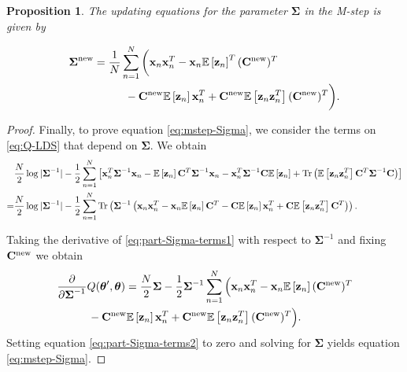 \documentclass[11pt]{article}
\numberwithin{equation}{section}
\newcommand{\expectation}[1]{\mathbb{E}\left[#1\right]}
\newcommand{\Tr}[1]{\text{Tr}\left(#1\right)}
\newcommand{\x}{{\bf x}}
\newcommand{\z}{{\bf z}}
\newtheorem{proposition}{Proposition}[section]
\begin{document}
\begin{proposition}
	The updating equations for the parameter $\boldsymbol{\Sigma}$ in the M-step is given by
	
	\begin{align}
		\boldsymbol{\Sigma}^{\text{\normalfont new}} &= \frac{1}{N}\sum_{n=1}^N\bigg(\x_n\x_n^T - \x_n \expectation{\z_n}^T ({\bf C}^{\text{\normalfont new}})^T \nonumber\\
		&\hspace{1cm} - {\bf C}^{\text{\normalfont new}}\expectation{\z_n}\x_n^T + {\bf C}^{\text{\normalfont new}} \expectation{\z_n \z_n^T}({\bf C}^{\text{\normalfont new}})^T \bigg). \label{eq:mstep-Sigma}
	\end{align}
\end{proposition}



\begin{proof}
	Finally, to prove equation \eqref{eq:mstep-Sigma}, we consider the terms on \eqref{eq:Q-LDS} that depend on $\boldsymbol{\Sigma}$. We obtain
	\begin{align}
		 & \frac{N}{2}\log\vert\boldsymbol\Sigma^{-1}\vert -\frac{1}{2}\sum_{n=1}^N \left[ \x_n^T \boldsymbol{\Sigma}^{-1}\x_n - \expectation{\z_n}{\bf C}^T\boldsymbol{\Sigma}^{-1}\x_n - \x_n^T \boldsymbol{\Sigma}^{-1}{\bf C}\expectation{\z_n} + \Tr{\expectation{\z_n\z_n^T}{\bf C}^T\boldsymbol{\Sigma}^{-1}{\bf C}} \right]\\
		=& \frac{N}{2}\log\vert\boldsymbol\Sigma^{-1}\vert -\frac{1}{2}\sum_{n=1}^N\Tr{\boldsymbol\Sigma^{-1} \left( \x_n\x_n^T - \x_n\expectation{\z_n}{\bf C}^T - {\bf C}\expectation{\z_n}\x_n^T + {\bf C}\expectation{\z_n\z_n^T}{\bf C}^T \right)}. \label{eq:part-Sigma-terms1}
	\end{align}
	
	Taking the derivative of \eqref{eq:part-Sigma-terms1} with respect to $\boldsymbol{\Sigma}^{-1}$ and fixing ${\bf C}^{\text{new}}$ we obtain
	\begin{align}
		&\frac{\partial}{\partial \boldsymbol{\Sigma}^{-1}} Q(\boldsymbol\theta', \boldsymbol\theta) = \frac{N}{2}\boldsymbol{\Sigma} - \frac{1}{2}\boldsymbol\Sigma^{-1}\sum_{n=1}^N\Big( \x_n\x_n^T - \x_n\expectation{\z_n}({\bf C}^{\text{new}})^T \nonumber\\
			&\hspace{1cm}- {\bf C}^{\text{new}}\expectation{\z_n}\x_n^T + {\bf C}^{\text{new}}\expectation{\z_n\z_n^T}({\bf C}^{\text{new}})^T \Big) \label{eq:part-Sigma-terms2}.
	\end{align}
	Setting equation \eqref{eq:part-Sigma-terms2} to zero and solving for $\boldsymbol{\Sigma}$ yields equation \eqref{eq:mstep-Sigma}.
\end{proof}
\end{document}
